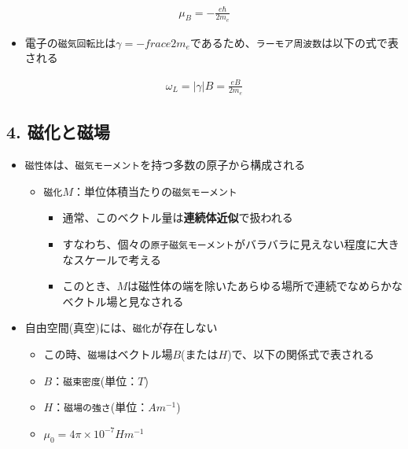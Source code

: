 \documentclass[11pt]{article}
\providecommand{\tightlist}{%
      \setlength{\itemsep}{0pt}\setlength{\parskip}{0pt}}
\begin{document}
\begin{eqnarray}
\mu_B = - \frac{e \hbar}{2 m_e}
\end{eqnarray}

\begin{itemize}
\tightlist
\item
  電子の\texttt{磁気回転比}は\(\gamma = - frac{e}{2 m_e}\)であるため、\texttt{ラーモア周波数}は以下の式で表される
\end{itemize}

\begin{eqnarray}
\omega_L = |\gamma| B = \frac{e B}{2 m_e}
\end{eqnarray}

    \subsection{4. 磁化と磁場}\label{ux78c1ux5316ux3068ux78c1ux5834}

\begin{itemize}
\item
  \texttt{磁性体}は、\texttt{磁気モーメント}を持つ多数の原子から構成される

  \begin{itemize}
  \item
    \texttt{磁化}\(M\)：単位体積当たりの\texttt{磁気モーメント}

    \begin{itemize}
    \item
      通常、このベクトル量は\textbf{連続体近似}で扱われる
    \item
      すなわち、個々の\texttt{原子磁気モーメント}がバラバラに見えない程度に大きなスケールで考える
    \item
      このとき、\(M\)は磁性体の端を除いたあらゆる場所で連続でなめらかなベクトル場と見なされる
    \end{itemize}
  \end{itemize}
\end{itemize}

    \begin{itemize}
\item
  自由空間(真空)には、\texttt{磁化}が存在しない

  \begin{itemize}
  \item
    この時、\texttt{磁場}はベクトル場\(B\)(または\(H\))で、以下の関係式で表される
  \item
    \(B\)：\texttt{磁束密度}(単位：\(T\))
  \item
    \(H\)：\texttt{磁場の強さ}(単位：\(Am^{-1}\))
  \item
    \(\mu_0 = 4 \pi \times 10^{-7} H m^{-1}\)
  \end{itemize}
\end{itemize}
\end{document}
